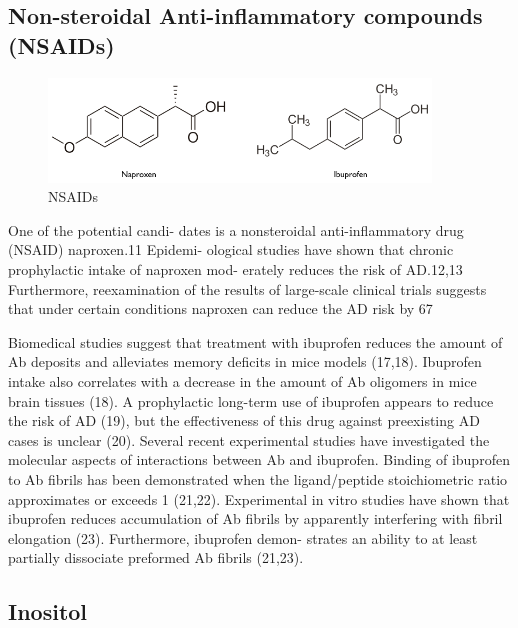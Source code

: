 \subsection{Non-steroidal Anti-inflammatory compounds (NSAIDs)}
\begin{figure}
\centering
\includegraphics[width=4in]{figures/introduction/nsaids.png}
\caption[NSAIDs]{NSAIDs}
\label{fig:polyphenols}
\end{figure}


One of the potential candi- dates is a nonsteroidal anti-inflammatory drug (NSAID) naproxen.11 Epidemi- ological studies have shown that chronic prophylactic intake of naproxen mod- erately reduces the risk of AD.12,13 Furthermore, reexamination of the results of large-scale clinical trials suggests that under certain conditions naproxen can reduce the AD risk by 67%

Biomedical studies suggest that treatment with ibuprofen reduces the amount of Ab deposits and alleviates memory deficits in mice models (17,18). Ibuprofen intake also correlates with a decrease in the amount of Ab oligomers in mice brain tissues (18). A prophylactic long-term use of ibuprofen appears to reduce the risk of AD (19), but the effectiveness of this drug against preexisting AD cases is unclear (20). Several recent experimental studies have investigated the molecular aspects of interactions between Ab and ibuprofen. Binding of ibuprofen to Ab fibrils has been demonstrated when the ligand/peptide stoichiometric ratio approximates or exceeds 1 (21,22). Experimental in vitro studies have shown that ibuprofen reduces accumulation of Ab fibrils by apparently interfering with fibril elongation (23). Furthermore, ibuprofen demon- strates an ability to at least partially dissociate preformed Ab fibrils (21,23).

\subsection{Inositol}

